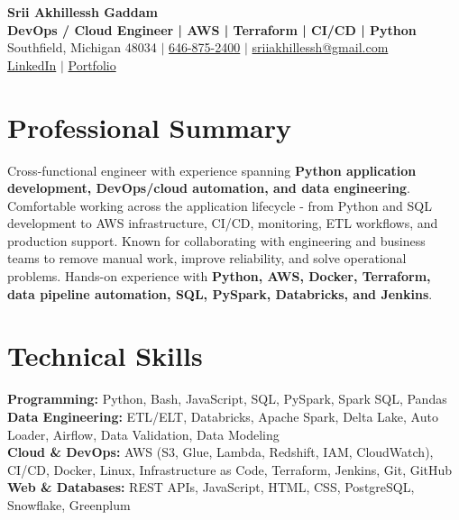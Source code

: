 \documentclass[letterpaper,10pt]{article}
\begin{document}
\fontsize{9.35pt}{10.45pt}\selectfont

\begin{center}
    {\LARGE \textbf{Srii Akhillessh Gaddam}} \\[-1pt]
    \textbf{DevOps / Cloud Engineer | AWS | Terraform | CI/CD | Python} \\[2pt]
    Southfield, Michigan 48034 $|$
    \href{tel:6468752400}{646-875-2400} $|$
    \href{mailto:sriiakhillessh@gmail.com}{sriiakhillessh@gmail.com} \\[1pt]
    \href{https://www.linkedin.com/in/srii-akhiilessh-gaddam-b48668191/}{LinkedIn} $|$
    \href{https://sriiakhillesshg.github.io/portfolio/}{Portfolio}
\end{center}
\vspace{-8pt}

\section{Professional Summary}
\small{Cross-functional engineer with experience spanning \textbf{Python application development, DevOps/cloud automation, and data engineering}. Comfortable working across the application lifecycle - from Python and SQL development to AWS infrastructure, CI/CD, monitoring, ETL workflows, and production support. Known for collaborating with engineering and business teams to remove manual work, improve reliability, and solve operational problems. Hands-on experience with \textbf{Python, AWS, Docker, Terraform, data pipeline automation, SQL, PySpark, Databricks, and Jenkins}.}

\section{Technical Skills}
\small{
\textbf{Programming:} Python, Bash, JavaScript, SQL, PySpark, Spark SQL, Pandas \\
\textbf{Data Engineering:} ETL/ELT, Databricks, Apache Spark, Delta Lake, Auto Loader, Airflow, Data Validation, Data Modeling \\
\textbf{Cloud \& DevOps:} AWS (S3, Glue, Lambda, Redshift, IAM, CloudWatch), CI/CD, Docker, Linux, Infrastructure as Code, Terraform, Jenkins, Git, GitHub \\
\textbf{Web \& Databases:} REST APIs, JavaScript, HTML, CSS, PostgreSQL, Snowflake, Greenplum
}
\end{document}
